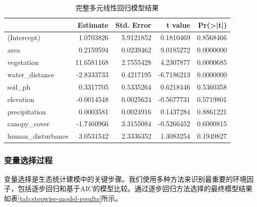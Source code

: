 \documentclass[
  twoside,12pt,fontset=none]{ctexbook}
\newenvironment{Shaded}{\begin{snugshade}}{\end{snugshade}}
\newcommand{\AttributeTok}[1]{\textcolor[rgb]{0.13,0.29,0.53}{#1}}
\newcommand{\CommentTok}[1]{\textcolor[rgb]{0.56,0.35,0.01}{\textit{#1}}}
\newcommand{\ConstantTok}[1]{\textcolor[rgb]{0.56,0.35,0.01}{#1}}
\newcommand{\DecValTok}[1]{\textcolor[rgb]{0.00,0.00,0.81}{#1}}
\newcommand{\FunctionTok}[1]{\textcolor[rgb]{0.13,0.29,0.53}{\textbf{#1}}}
\newcommand{\NormalTok}[1]{#1}
\newcommand{\OtherTok}[1]{\textcolor[rgb]{0.56,0.35,0.01}{#1}}
\newcommand{\SpecialCharTok}[1]{\textcolor[rgb]{0.81,0.36,0.00}{\textbf{#1}}}
\newcommand{\StringTok}[1]{\textcolor[rgb]{0.31,0.60,0.02}{#1}}
\begin{document}
\begin{table}[!h]
\centering
\caption{\label{tab:full-model-results}完整多元线性回归模型结果}
\centering
\begin{tabular}[t]{lrrrr}
\toprule
  & Estimate & Std. Error & t value & Pr(>|t|)\\
\midrule
(Intercept) & 1.0703826 & 5.9121852 & 0.1810469 & 0.8568466\\
area & 0.2159594 & 0.0239462 & 9.0185272 & 0.0000000\\
vegetation & 11.6581168 & 2.7555428 & 4.2307877 & 0.0000685\\
water\_distance & -2.8333733 & 0.4217195 & -6.7186213 & 0.0000000\\
soil\_ph & 0.3317705 & 0.5335264 & 0.6218446 & 0.5360358\\
\addlinespace
elevation & -0.0014548 & 0.0025624 & -0.5677731 & 0.5719801\\
precipitation & 0.0003581 & 0.0024916 & 0.1437284 & 0.8861221\\
canopy\_cover & -1.7460966 & 3.3155084 & -0.5266452 & 0.6000815\\
human\_disturbance & 3.0531542 & 2.3336352 & 1.3083254 & 0.1949827\\
\bottomrule
\end{tabular}
\end{table}

\hypertarget{ux53d8ux91cfux9009ux62e9ux8fc7ux7a0b}{%
\subsubsection{变量选择过程}\label{ux53d8ux91cfux9009ux62e9ux8fc7ux7a0b}}

变量选择是生态统计建模中的关键步骤。我们使用多种方法来识别最重要的环境因子，包括逐步回归和基于AIC的模型比较。通过逐步回归方法选择的最终模型结果如表\ref{tab:stepwise-model-results}所示。

\begin{Shaded}
\end{Shaded}
\end{document}

